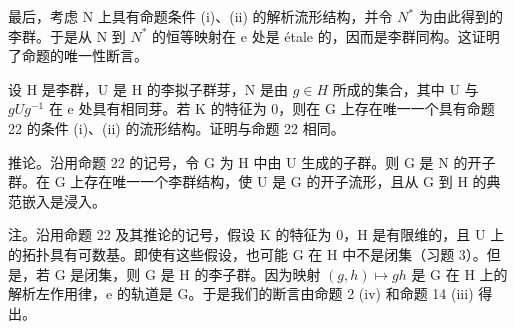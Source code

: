 最后，考虑 N 上具有命题条件 (i)、(ii) 的解析流形结构，并令 \(N^{*}\) 为由此得到的李群。于是从 N 到 \(N^{*}\) 的恒等映射在 e 处是 étale 的，因而是李群同构。这证明了命题的唯一性断言。

设 H 是李群，U 是 H 的李拟子群芽，N 是由 \(g \in H\) 所成的集合，其中 U 与 \(gUg^{-1}\) 在 e 处具有相同芽。若 K 的特征为 0，则在 G 上存在唯一一个具有命题 22 的条件 (i)、(ii) 的流形结构。证明与命题 22 相同。

推论。沿用命题 22 的记号，令 G 为 H 中由 U 生成的子群。则 G 是 N 的开子群。在 G 上存在唯一一个李群结构，使 U 是 G 的开子流形，且从 G 到 H 的典范嵌入是浸入。

注。沿用命题 22 及其推论的记号，假设 K 的特征为 0，H 是有限维的，且 U 上的拓扑具有可数基。即使有这些假设，也可能 G 在 H 中不是闭集（习题 3）。但是，若 G 是闭集，则 G 是 H 的李子群。因为映射 \((g,h)\mapsto gh\) 是 G 在 H 上的解析左作用律，e 的轨道是 G。于是我们的断言由命题 2 (iv) 和命题 14 (iii) 得出。

